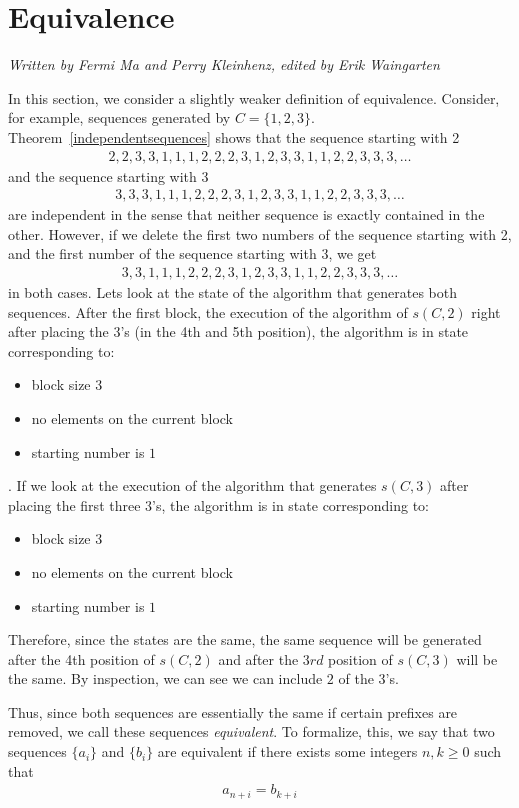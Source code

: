 \documentclass[runningheads,a4paper]{llncs}
\begin{document}
\section{Equivalence}
\label{equivalence}
\emph{Written by Fermi Ma and Perry Kleinhenz, edited by Erik Waingarten}

In this section, we consider a slightly weaker definition of equivalence. Consider, for example, sequences generated by $C = \{1,2,3\}$. Theorem~\ref{independentsequences} shows that the sequence starting with 2
\begin{align*}
2,2,3,3,1,1,1,2,2,2,3,1,2,3,3,1,1,2,2,3,3,3,\dots
\end{align*}
and the sequence starting with 3
\begin{align*}
3,3,3,1,1,1,2,2,2,3,1,2,3,3,1,1,2,2,3,3,3,\dots
\end{align*}
are independent in the sense that neither sequence is exactly contained in the other. However, if we delete the first two numbers of the sequence starting with 2, and the first number of the sequence starting with 3, we get 
\begin{align*}
3,3,1,1,1,2,2,2,3,1,2,3,3,1,1,2,2,3,3,3,\dots
\end{align*}
in both cases. Lets look at the state of the algorithm that generates both sequences. After the first block, the execution of the algorithm of $s(C, 2)$ right after placing the $3$'s (in the 4th and 5th position), the algorithm is in state corresponding to:
\begin{itemize}
\item block size $3$
\item no elements on the current block
\item starting number is $1$
\end{itemize}.   
If we look at the execution of the algorithm that generates $s(C, 3)$ after placing the first three $3$'s, the algorithm is in state corresponding to:
\begin{itemize}
\item block size $3$
\item no elements on the current block
\item starting number is $1$
\end{itemize}
Therefore, since the states are the same, the same sequence will be generated after the 4th position of $s(C, 2)$ and after the $3rd$ position of $s(C, 3)$ will be the same. By inspection, we can see we can include $2$ of the 3's.

Thus, since both sequences are essentially the same if certain prefixes are removed, we call these sequences \emph{equivalent}. To formalize, this, we say that two sequences $\{a_i\}$ and $\{b_i\}$ are equivalent if there exists some integers $n,k \geq 0$ such that
\begin{align*}
a_{n+i} = b_{k+i}
\end{align*}
\end{document}
